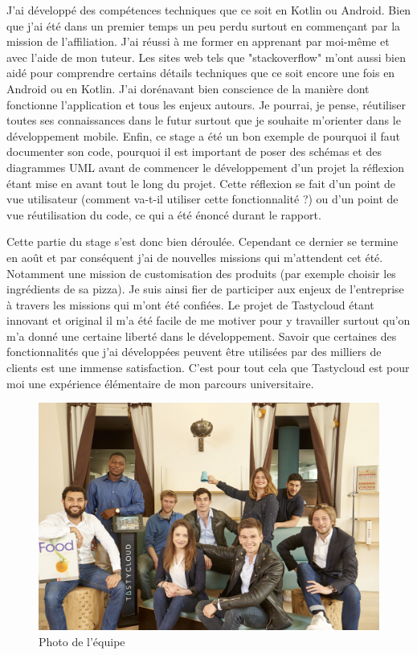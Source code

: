 J'ai développé des compétences techniques que ce soit en Kotlin ou Android. Bien que j'ai été dans un premier temps un peu perdu surtout en commençant par la mission de l'affiliation. J'ai réussi à me former en apprenant par moi-même et avec l'aide de mon tuteur. Les sites web tels que "stackoverflow" m'ont aussi bien aidé pour comprendre certains détails techniques que ce soit encore une fois en Android ou en Kotlin. J'ai dorénavant bien conscience de la manière dont fonctionne l'application et tous les enjeux autours. Je pourrai, je pense, réutiliser toutes ses connaissances dans le futur surtout que je souhaite m'orienter dans le développement mobile. Enfin, ce stage a été un bon exemple de pourquoi il faut documenter son code, pourquoi il est important de poser des schémas et des diagrammes UML avant de commencer le développement d'un projet la réflexion étant mise en avant tout le long du projet. Cette réflexion se fait d'un point de vue utilisateur (comment va-t-il utiliser cette fonctionnalité ?) ou d'un point de vue réutilisation du code, ce qui a été énoncé durant le rapport.

Cette partie du stage s'est donc bien déroulée. Cependant ce dernier se termine en août et par conséquent j'ai de nouvelles missions qui m'attendent cet été. Notamment une mission de customisation des produits (par exemple choisir les ingrédients de sa pizza). Je suis ainsi fier de participer aux enjeux de l’entreprise à travers les missions qui m’ont été confiées. Le projet de Tastycloud étant innovant et original il m'a été facile de me motiver pour y travailler surtout qu'on m'a donné une certaine liberté dans le développement. Savoir que certaines des fonctionnalités que j'ai développées peuvent être utilisées par des milliers de clients est une immense satisfaction. C'est pour tout cela que Tastycloud est pour moi une expérience élémentaire de mon parcours universitaire.

\begin{figure}[!htp]
  \centering
  \includegraphics[width=130mm,scale=0.5]{images/equipe.jpg}
  \caption{Photo de l'équipe}
  \label{fig:boat1}
\end{figure}

